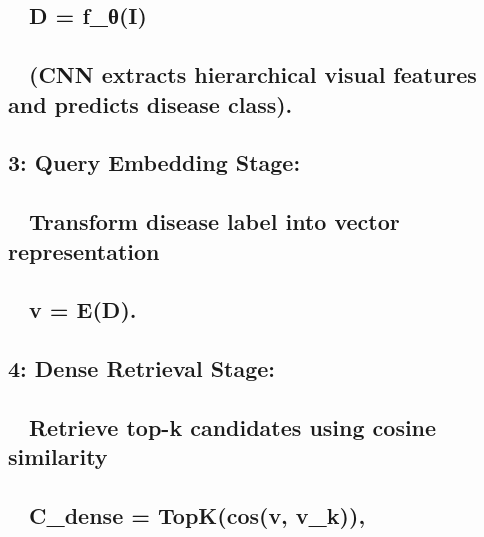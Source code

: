 \subsection*{ D = f\_θ(I)}\label{d-f_ux3b8i}

\subsection*{ (CNN extracts hierarchical visual features and predicts
disease
class).}\label{cnn-extracts-hierarchical-visual-features-and-predicts-disease-class.}

\subsection*{3: Query Embedding Stage:}\label{query-embedding-stage}

\subsection*{ Transform disease label into vector
representation}\label{transform-disease-label-into-vector-representation}

\subsection*{ v = E(D).}\label{v-ed.}

\subsection*{4: Dense Retrieval Stage:}\label{dense-retrieval-stage}

\subsection*{ Retrieve top-k candidates using cosine
similarity}\label{retrieve-top-k-candidates-using-cosine-similarity}

\subsection*{ C\_dense = TopK(cos(v,
v\_k)),}\label{c_dense-topkcosv-v_k}

